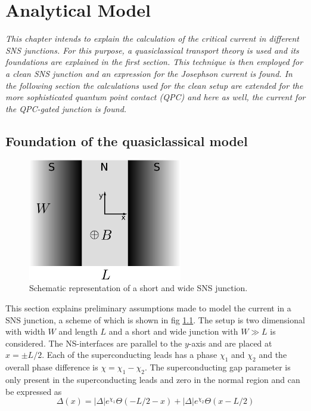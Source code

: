 \chapter{Analytical Model}
\label{ch:analyticalmodel}
\textit{This chapter intends to explain the calculation of the critical current in different SNS junctions. For this purpose, a quasiclassical transport theory is used and its foundations are explained in the first section. This technique is then employed for a clean SNS junction and an expression for the Josephson current is found. In the following section the calculations used for the clean setup are extended for the more sophisticated quantum point contact (QPC) and here as well, the current for the QPC-gated junction is found.}

\section{Foundation of the quasiclassical model}
\begin{figure}
\centering	
\includegraphics[width=0.6\textwidth]{figure/analyticalmodel/sns_junction}
\caption{Schematic representation of a short and wide SNS junction.}
\label{fig:sns_schematic}
\end{figure}
This section explains preliminary assumptions made to model the current in a SNS junction, a scheme of which is  shown in fig \ref{fig:sns_schematic}. The setup is two dimensional with width $W$ and length $L$ and a short and wide junction with $W \gg L$ is considered. The NS-interfaces are parallel to the $y$-axis and are placed at $x = \pm L/2$. Each of the superconducting leads has a phase $\chi_{1}$ and $\chi_{2}$ and the overall phase difference is $\chi = \chi_{1} - \chi_{2}$. The superconducting gap parameter is only present in the superconducting leads and zero in the normal region and can be expressed as
\begin{equation}
\Delta\left( x \right) = |\Delta| e^{\chi_1} \Theta\left(-L/2 -x \right) + |\Delta| e^{\chi_2} \Theta\left(x-L/2 \right) 
\label{eq:gap_parameter}
\end{equation}

